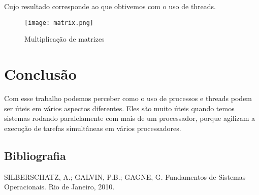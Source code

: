 \documentclass[
	article,			%
	11pt,				%
	oneside,			%
	a4paper,			%
	english,			%
	brazil,				%
	sumario=tradicional
	]{abntex2}
\begin{document}
Cujo resultado corresponde ao que obtivemos com o uso de threads.

\begin{figure}[!htb]
\centering
\texttt{[image: matrix.png]}
\caption{Multiplicação de matrizes}
\end{figure}
\newpage

\section*{Conclusão}

Com esse trabalho podemos perceber como o uso de processos e threads podem ser úteis em vários aspectos diferentes. Eles são muito úteis quando temos sistemas rodando paralelamente com mais de um processador, porque agilizam a execução de tarefas simultâneas em vários processadores. 

\newpage

\begin{center}
\section*{Bibliografia}
\end{center}

SILBERSCHATZ, A.; GALVIN, P.B.; GAGNE, G. Fundamentos de Sistemas Operacionais. Rio de Janeiro, 2010.

\newpage 

\postextual



%
%
\end{document}
